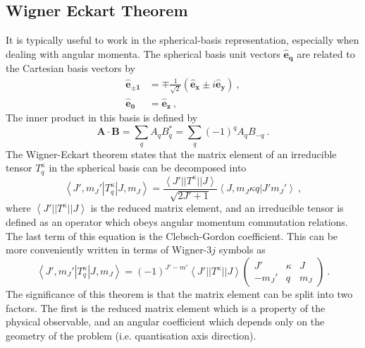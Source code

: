 \documentclass{article}
\begin{document}
\subsection{Wigner Eckart Theorem}
It is typically useful to work in the spherical-basis representation, especially when dealing with angular momenta. The spherical basis unit vectors $\boldsymbol{\hat{e}_{q}}$ are related to the Cartesian basis vectors by 
\begin{align}
    \boldsymbol{\hat{e}_{\pm{1}}} &= \mp \frac{1}{\sqrt{2}} \left(\boldsymbol{\hat{e}_x} \pm i\boldsymbol{\hat{e}_y}\right)~, \\
    \boldsymbol{\hat{e}_{0}} &= \boldsymbol{\hat{e}_z}~,
\end{align}
The inner product in this basis is defined by 
\begin{equation}
    \mathbf{A}\cdot\mathbf{B} = \sum_q A_qB^*_q =  \sum_q (-1)^qA_qB_{-q}~.
\end{equation}
The Wigner-Eckart theorem states that the matrix element of an irreducible tensor $T^{\kappa}_q$ in the spherical basis can be decomposed into 
\begin{equation}
    \left\langle J', m_J'|T^{\kappa}_q|J, m_J\right\rangle=\frac{\left\langle J'||T^{\kappa}||J\right\rangle}{\sqrt{2J'+1}}\left\langle J, m_J\kappa q|J'm_J'\right\rangle~,
\end{equation}
where $\left\langle J'||T^{\kappa}||J\right\rangle$ is the reduced matrix element, and an irreducible tensor is defined as an operator which obeys angular momentum commutation relations. The last term of this equation is the Clebsch-Gordon coefficient. This can be more conveniently written in terms of Wigner-$3j$ symbols as
\begin{equation}
\left\langle J', m_J'|T^{\kappa}_q|J, m_J\right\rangle= (-1)^{J'-m'}\left\langle J'||T^{\kappa}||J\right\rangle
\begin{pmatrix}
J' & \kappa & J\\
-m_J' & q & m_J
\end{pmatrix}~.
\end{equation}
The significance of this theorem is that the matrix element can be split into two factors. The first is the reduced matrix element which is a property of the physical observable, and an angular coefficient which depends only on the geometry of the problem (i.e. quantisation axis direction).
\end{document}
